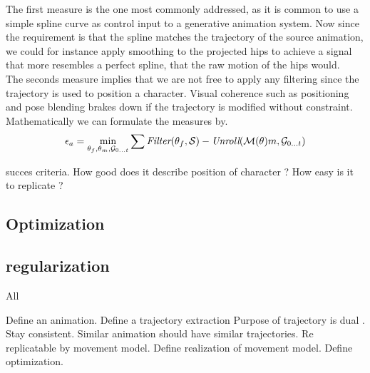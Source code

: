 The first measure is the one most commonly addressed, as it is common to use a simple spline curve as control input to a generative animation system. Now since the requirement is that the spline matches the trajectory of the source animation, we could for instance apply smoothing to the projected hips to achieve a signal that more resembles a perfect spline, that the raw motion of the hips would.\\
The seconds measure implies that we are not free to apply any filtering since the trajectory is used to position a character. Visual coherence such as positioning and pose blending brakes down if the trajectory is modified without constraint.\\
Mathematically we can formulate the measures by.
\begin{equation}
    \epsilon_a=\min_{\theta_f,\theta_m,{\mathcal{G}_{0\dots{t}}}}\sum{ \textit{Filter} (\theta_f,\mathcal{S})- \textit{Unroll} ( \mathcal{M} (\theta)m, \mathcal{G} _{0\dots{t}}) }
\end{equation}



succes criteria. How good does it describe position of character ? How easy is it to replicate ?


\subsection{Optimization}
\subsection{regularization}


All 

Define an animation.
Define a trajectory extraction
Purpose of trajectory is dual . Stay consistent. Similar animation should have similar trajectories. Re replicatable by movement model. 
Define realization of movement model. 
Define optimization.


